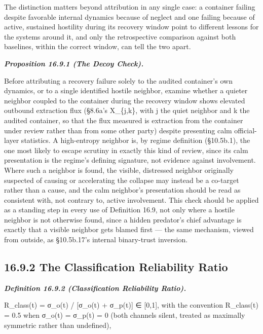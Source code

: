 \documentclass[
]{article}
\begin{document}
The distinction matters beyond attribution in any single case: a
container failing despite favorable internal dynamics because of neglect
and one failing because of active, sustained hostility during its
recovery window point to different lessons for the systems around it,
and only the retrospective comparison against both baselines, within the
correct window, can tell the two apart.

\emph{\textbf{Proposition 16.9.1 (The Decoy Check).}}

Before attributing a recovery failure solely to the audited container's
own dynamics, or to a single identified hostile neighbor, examine
whether a quieter neighbor coupled to the container during the recovery
window shows elevated outbound extraction flux (§8.6a's X\_\{j,k\}, with
j the quiet neighbor and k the audited container, so that the flux
measured is extraction from the container under review rather than from
some other party) despite presenting calm official-layer statistics. A
high-entropy neighbor is, by regime definition (§10.5b.1), the one most
likely to escape scrutiny in exactly this kind of review, since its calm
presentation is the regime's defining signature, not evidence against
involvement. Where such a neighbor is found, the visible, distressed
neighbor originally suspected of causing or accelerating the collapse
may instead be a co-target rather than a cause, and the calm neighbor's
presentation should be read as consistent with, not contrary to, active
involvement. This check should be applied as a standing step in every
use of Definition 16.9, not only where a hostile neighbor is not
otherwise found, since a hidden predator's chief advantage is exactly
that a visible neighbor gets blamed first --- the same mechanism, viewed
from outside, as §10.5b.17's internal binary-trust inversion.

\hypertarget{the-classification-reliability-ratio}{%
\subsection{16.9.2 The Classification Reliability
Ratio}\label{the-classification-reliability-ratio}}

\emph{\textbf{Definition 16.9.2 (Classification Reliability Ratio).}}

R\_class(t) = σ\_o(t) / {[}σ\_o(t) + σ\_p(t){]} ∈ {[}0,1{]}, with the
convention R\_class(t) = 0.5 when σ\_o(t) = σ\_p(t) = 0 (both channels
silent, treated as maximally symmetric rather than undefined),
\end{document}
